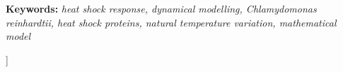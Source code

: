 \documentclass[oneside, 10pt, a4paper, twocolumn]{article}
\providecommand{\keywords}[1]{\textbf{Keywords:} \textit{#1}}
\begin{document}
\begin{@twocolumnfalse}
\begin{abstract}
    \end{abstract}
    \vspace{0.2cm}
    \keywords{heat shock response, dynamical modelling, Chlamydomonas reinhardtii, heat shock proteins, natural temperature variation, mathematical model}
    \vspace{1cm}
  \end{@twocolumnfalse}
]
\end{document}
